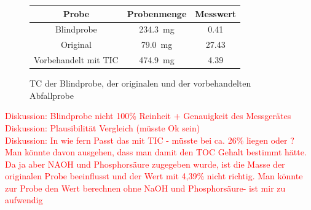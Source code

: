 \begin{figure}[h!]
	\renewcommand{\arraystretch}{1.2}
	\centering
	\caption{TC der Blindprobe, der originalen und der vorbehandelten Abfallprobe}
	\label{tab:tc_messung}
	\begin{tabular}{c|c|c}
		\hline
		\textbf{Probe} & \textbf{Probenmenge} & \textbf{Messwert}  \\
		\hline
		Blindprobe				&	\SI{234,3}{\milli \gram}	& \SI{0,41}{\mpercent}	\\
		Original				&	\SI{79,0}{\milli \gram}	& \SI{27,43}{\mpercent}		 \\
		Vorbehandelt mit TIC	&	\SI{474,9}{\milli \gram}	& \SI{4,39}{\mpercent}\\
		\hline
	\end{tabular}
\end{figure}
\FloatBarrier
\textcolor{red}{Diskussion: Blindprobe nicht 100\% Reinheit + Genauigkeit des Messgerätes}\\
\textcolor{red}{Diskussion: Plausibilität Vergleich (müsste Ok sein)}\\
\textcolor{red}{Diskussion: In wie fern Passt das mit TIC - müsste bei ca. 26\% liegen oder ?\\
Man könnte davon ausgehen, dass man damit den TOC Gehalt bestimmt hätte. Da ja aber NAOH und Phosphorsäure zugegeben wurde, ist die Masse der originalen Probe beeinflusst und der Wert mit 4,39\% nicht richtig. Man könnte zur Probe den Wert berechnen ohne NaOH und Phosphorsäure- ist mir zu aufwendig}

